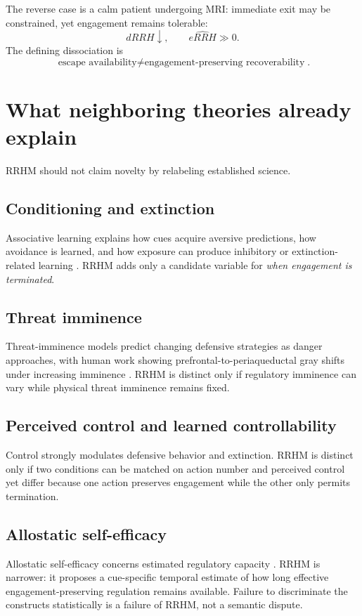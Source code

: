 \documentclass[9pt,twocolumn]{article}
\begin{document}
The reverse case is a calm patient undergoing MRI: immediate exit may be constrained, yet engagement remains tolerable:
\[
 dRRH\downarrow,\qquad \widehat{eRRH}\gg0.
\]
The defining dissociation is
\[
\boxed{\text{escape availability}\neq\text{engagement-preserving recoverability}}.
\]

\section{What neighboring theories already explain}
RRHM should not claim novelty by relabeling established science.

\subsection{Conditioning and extinction}
Associative learning explains how cues acquire aversive predictions, how avoidance is learned, and how exposure can produce inhibitory or extinction-related learning \cite{krypotos2015,pittig2018,kausche2025}. RRHM adds only a candidate variable for \emph{when engagement is terminated}.

\subsection{Threat imminence}
Threat-imminence models predict changing defensive strategies as danger approaches, with human work showing prefrontal-to-periaqueductal gray shifts under increasing imminence \cite{mobbs2007}. RRHM is distinct only if regulatory imminence can vary while physical threat imminence remains fixed.

\subsection{Perceived control and learned controllability}
Control strongly modulates defensive behavior and extinction. RRHM is distinct only if two conditions can be matched on action number and perceived control yet differ because one action preserves engagement while the other only permits termination.

\subsection{Allostatic self-efficacy}
Allostatic self-efficacy concerns estimated regulatory capacity \cite{stephan2016}. RRHM is narrower: it proposes a cue-specific temporal estimate of how long effective engagement-preserving regulation remains available. Failure to discriminate the constructs statistically is a failure of RRHM, not a semantic dispute.
\end{document}
